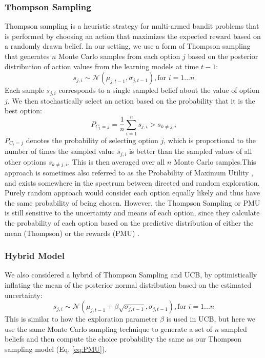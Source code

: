 \subsubsection{Thompson Sampling}
Thompson \citeyear{thompson1933likelihood} sampling is a heuristic strategy for multi-armed bandit problems that is performed by choosing an action that maximizes the expected reward based on a randomly drawn belief. In our setting, we use a form of Thompson sampling that generates $n$ Monte Carlo samples from each option $j$ based on the posterior distribution of action values from the learning models at time $t-1$:
\begin{equation}
    s_{j,i} \sim \mathcal{N}(\mu_{j,t-1},\sigma_{j, t-1}), \text{for } i = 1... n
\end{equation}
Each sample $s_{j,i}$ corresponds to a single sampled belief about the value of option $j$. We then stochastically select an action based on the probability that it is the best option:
\begin{equation}
    P_{C_{t}=j}=\frac{1}{n}\sum_{i=1}^{n} s_{j,i}>s_{k\neq j,i}
    \label{eq:PMU}
\end{equation}
$P_{C_{t}=j}$ denotes the probability of selecting option $j$, which is proportional to the number of times the sampled value $s_{j,i}$ is better than the sampled values of all other options $s_{k\neq j,i}$. This is then averaged over all $n$ Monte Carlo samples.This approach is sometimes also referred to as the Probability of Maximum Utility \citep{speekenbrink2015uncertainty, wu2018generalization}, and exists somewhere in the spectrum between directed and random exploration. Purely random approach would consider each option equally likely and thus have the same probability of being chosen. However, the Thompson Sampling or PMU is still sensitive to the uncertainty and means of each option, since they calculate the probability of each option based on the predictive distribution of either the mean (Thompson) or the rewards (PMU) \citep{schulz2017putting}.

\subsubsection{Hybrid Model}
We also considered a hybrid of Thompson Sampling and UCB, by optimistically inflating the mean of the posterior normal distribution based on the estimated uncertainty:
\begin{equation}
    s_{j,i} \sim \mathcal{N}(\mu_{j,t-1} + \beta\sqrt{\sigma_{j, t-1}},\sigma_{j, t-1}), \text{for } i = 1... n
\end{equation}
This is similar to how the exploration parameter $\beta$ is used in UCB, but here we use the same Monte Carlo sampling technique to generate a set of $n$ sampled beliefs and then compute the choice probability the same as our Thompson sampling model (Eq. \ref{eq:PMU}).




